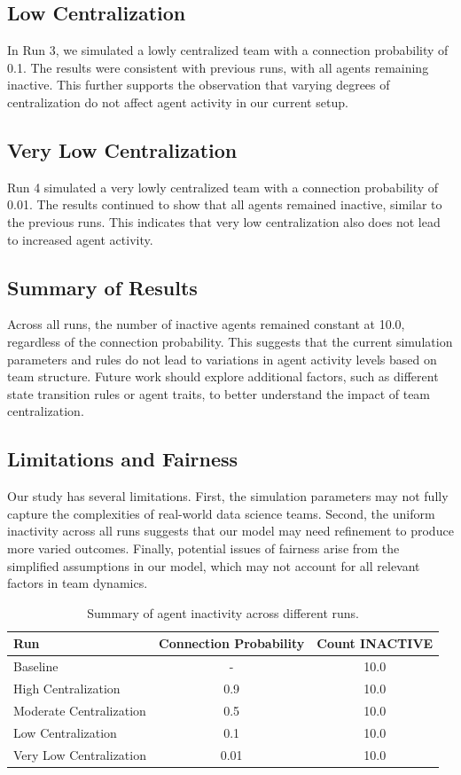 \documentclass{article} %
\begin{document}
\subsection{Low Centralization}
In Run 3, we simulated a lowly centralized team with a connection probability of 0.1. The results were consistent with previous runs, with all agents remaining inactive. This further supports the observation that varying degrees of centralization do not affect agent activity in our current setup.

\subsection{Very Low Centralization}
Run 4 simulated a very lowly centralized team with a connection probability of 0.01. The results continued to show that all agents remained inactive, similar to the previous runs. This indicates that very low centralization also does not lead to increased agent activity.

\subsection{Summary of Results}
Across all runs, the number of inactive agents remained constant at 10.0, regardless of the connection probability. This suggests that the current simulation parameters and rules do not lead to variations in agent activity levels based on team structure. Future work should explore additional factors, such as different state transition rules or agent traits, to better understand the impact of team centralization.

\subsection{Limitations and Fairness}
Our study has several limitations. First, the simulation parameters may not fully capture the complexities of real-world data science teams. Second, the uniform inactivity across all runs suggests that our model may need refinement to produce more varied outcomes. Finally, potential issues of fairness arise from the simplified assumptions in our model, which may not account for all relevant factors in team dynamics.


\begin{table}[t]
    \centering
    \begin{tabular}{lcc}
        \toprule
        Run & Connection Probability & Count INACTIVE \\
        \midrule
        Baseline & - & 10.0 \\
        High Centralization & 0.9 & 10.0 \\
        Moderate Centralization & 0.5 & 10.0 \\
        Low Centralization & 0.1 & 10.0 \\
        Very Low Centralization & 0.01 & 10.0 \\
        \bottomrule
    \end{tabular}
    \caption{Summary of agent inactivity across different runs.}
    \label{tab:results_summary}
\end{table}
\end{document}
